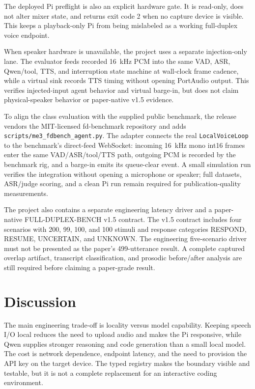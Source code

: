 \documentclass[sigconf,nonacm,balance=false]{acmart}
\begin{document}
The deployed Pi preflight is also an explicit hardware gate. It is read-only,
does not alter mixer state, and returns exit code 2 when no capture device is
visible. This keeps a playback-only Pi from being mislabeled as a working
full-duplex voice endpoint.

When speaker hardware is unavailable, the project uses a separate
injection-only lane. The evaluator feeds recorded 16~kHz PCM into the same
VAD, ASR, Qwen/tool, TTS, and interruption state machine at wall-clock frame
cadence, while a virtual sink records TTS timing without opening PortAudio
output. This verifies injected-input agent behavior and virtual barge-in, but
does not claim physical-speaker behavior or paper-native v1.5 evidence.

\begin{sloppypar}
To align the class evaluation with the supplied public benchmark, the release
vendors the MIT-licensed fd-benchmark repository and adds
\texttt{scripts/me3\_fdbench\_agent.py}. The adapter connects the real
\texttt{LocalVoiceLoop} to the benchmark's direct-feed WebSocket: incoming
16~kHz mono int16 frames enter the same VAD/ASR/tool/TTS path, outgoing PCM is
recorded by the benchmark rig, and a barge-in emits its queue-clear event. A
small simulation run verifies the integration without opening a microphone or
speaker; full datasets, ASR/judge scoring, and a clean Pi run remain required
for publication-quality measurements.
\end{sloppypar}

The project also contains a separate engineering latency driver and a
paper-native FULL-DUPLEX-BENCH v1.5 contract. The v1.5 contract includes four
scenarios with 200, 99, 100, and 100 stimuli and response categories RESPOND,
RESUME, UNCERTAIN, and UNKNOWN. The engineering five-scenario driver must not
be presented as the paper's 499-utterance result. A complete captured overlap
artifact, transcript classification, and prosodic before/after analysis are
still required before claiming a paper-grade result.

\section{Discussion}

The main engineering trade-off is locality versus model capability. Keeping
speech I/O local reduces the need to upload audio and makes the Pi responsive,
while Qwen supplies stronger reasoning and code generation than a small local
model. The cost is network dependence, endpoint latency, and the need to
provision the API key on the target device. The typed registry makes the
boundary visible and testable, but it is not a complete replacement for an
interactive coding environment.
\end{document}

